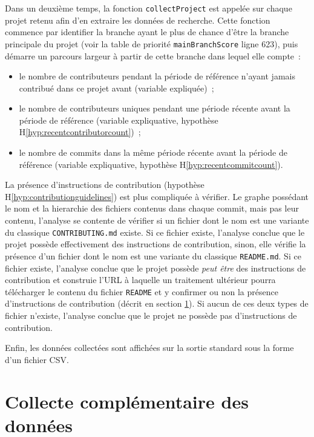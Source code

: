 Dans un deuxième temps, la fonction \texttt{collectProject} est appelée sur chaque projet retenu afin d'en
extraire les données de recherche. Cette fonction commence par identifier la branche ayant le plus de chance
d'être la branche principale du projet (voir la table de priorité \texttt{mainBranchScore} ligne 623), puis
démarre un parcours largeur à partir de cette branche dans lequel elle compte :

\begin{itemize}
    \item le nombre de contributeurs pendant la période de référence n'ayant jamais contribué dans ce projet
        avant (variable expliquée) ;
    \item le nombre de contributeurs uniques pendant une période récente avant la période de référence
        (variable expliquative, hypothèse H\ref{hyp:recentcontributorcount}) ;
    \item le nombre de \glspl{commit} dans la même période récente avant la période de référence (variable
        expliquative, hypothèse H\ref{hyp:recentcommitcount}).
\end{itemize}

La présence d'instructions de contribution (hypothèse H\ref{hyp:contributionguidelines}) est plus compliquée à
vérifier. Le graphe possédant le nom et la hierarchie des fichiers contenus dans chaque \gls{commit}, mais pas
leur contenu, l'analyse se contente de vérifier si un fichier dont le nom est une variante du classique
\texttt{CONTRIBUTING.md} existe. Si ce fichier existe, l'analyse conclue que le projet possède effectivement
des instructions de contribution, sinon, elle vérifie la présence d'un fichier dont le nom est une variante du
classique \texttt{README.md}. Si ce fichier existe, l'analyse conclue que le projet possède \emph{peut être}
des instructions de contribution et construie l'URL à laquelle un traitement ultérieur pourra télécharger le
contenu du fichier \texttt{README} et y confirmer ou non la présence d'instructions de contribution (décrit en
section \ref{sec:collectreadme}). Si aucun de ces deux types de fichier n'existe, l'analyse conclue que le
projet ne possède pas d'instructions de contribution.

Enfin, les données collectées sont affichées sur la sortie standard sous la forme d'un fichier CSV.

\section{Collecte complémentaire des données}
\label{sec:collectreadme}

